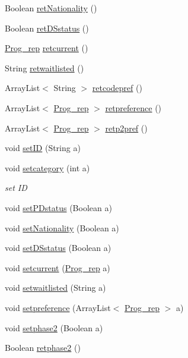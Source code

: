 \begin{DoxyCompactItemize}
Boolean \hyperlink{classalgo1_1_1Candidate_a2bb4223e00b5d69340db498b37a177fc}{ret\+Nationality} ()
\item 
Boolean \hyperlink{classalgo1_1_1Candidate_a03d9dd7c570933348c481367635ffde0}{ret\+D\+Sstatus} ()
\item 
\hyperlink{classalgo1_1_1Candidate_1_1Prog__rep}{Prog\+\_\+rep} \hyperlink{classalgo1_1_1Candidate_a493e0636c7222053ae6dd73fe5479f41}{retcurrent} ()
\item 
String \hyperlink{classalgo1_1_1Candidate_ad703d25063b19fe7e7364635f3d7db7c}{retwaitlisted} ()
\item 
Array\+List$<$ String $>$ \hyperlink{classalgo1_1_1Candidate_a25387cafff70a23c6183cabbd977ddae}{retcodepref} ()
\item 
Array\+List$<$ \hyperlink{classalgo1_1_1Candidate_1_1Prog__rep}{Prog\+\_\+rep} $>$ \hyperlink{classalgo1_1_1Candidate_ae6d04fe2e2b80283b99c05806014542b}{retpreference} ()
\item 
Array\+List$<$ \hyperlink{classalgo1_1_1Candidate_1_1Prog__rep}{Prog\+\_\+rep} $>$ \hyperlink{classalgo1_1_1Candidate_a18b976a123941824d6af496e629aa563}{retp2pref} ()
\item 
void \hyperlink{classalgo1_1_1Candidate_ac3fca899ed2ff282a7e2ea86bb7cb136}{set\+I\+D} (String a)
\item 
void \hyperlink{classalgo1_1_1Candidate_a6c4f47142a23f583611b195ae95b760f}{setcategory} (int a)
\begin{DoxyCompactList}\small\item\em set I\+D \end{DoxyCompactList}\item 
void \hyperlink{classalgo1_1_1Candidate_a5bcc56e00fef62570e606b62a500079e}{set\+P\+Dstatus} (Boolean a)
\item 
void \hyperlink{classalgo1_1_1Candidate_a37ee1ecb6665a94a951ee1a77a8a4d41}{set\+Nationality} (Boolean a)
\item 
void \hyperlink{classalgo1_1_1Candidate_ab258e1fe9ee4b1b7718fa9839f10a6c4}{set\+D\+Sstatus} (Boolean a)
\item 
void \hyperlink{classalgo1_1_1Candidate_ab899ae007b618eb18748b4daac995895}{setcurrent} (\hyperlink{classalgo1_1_1Candidate_1_1Prog__rep}{Prog\+\_\+rep} a)
\item 
void \hyperlink{classalgo1_1_1Candidate_a76b0a390b3f6eff005e4e6b848e892f8}{setwaitlisted} (String a)
\item 
void \hyperlink{classalgo1_1_1Candidate_ac0fb0aab52f490c18e0a0f6476609424}{setpreference} (Array\+List$<$ \hyperlink{classalgo1_1_1Candidate_1_1Prog__rep}{Prog\+\_\+rep} $>$ a)
\item 
void \hyperlink{classalgo1_1_1Candidate_aba8fad50474fba8f07233c4906df569e}{setphase2} (Boolean a)
\item 
Boolean \hyperlink{classalgo1_1_1Candidate_a58e5d23bfa2289304f2c908e3f60ace7}{retphase2} ()
\end{DoxyCompactItemize}


